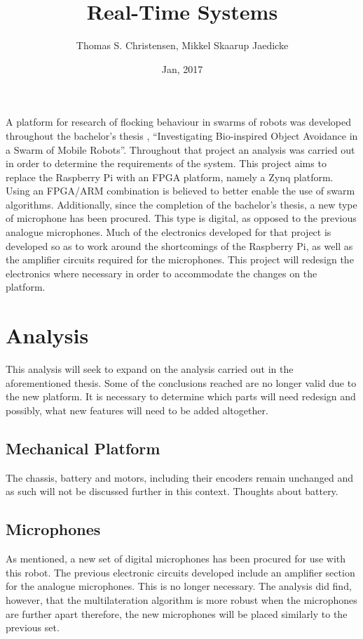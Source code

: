 \documentclass[11pt]{article}
\title{Real-Time Systems}
\author{Thomas S. Christensen, Mikkel Skaarup Jaedicke}
\date{Jan, 2017}
\begin{document}
A platform for research of flocking behaviour in swarms of robots was developed throughout the bachelor's thesis , ``Investigating Bio-inspired Object Avoidance in a Swarm of Mobile Robots''.
Throughout that project an analysis was carried out in order to determine the requirements of the system.
This project aims to replace the Raspberry Pi with an FPGA platform, namely a Zynq platform.
Using an FPGA/ARM combination is believed to better enable the use of swarm algorithms.
Additionally, since the completion of the bachelor's thesis, a new type of microphone has been procured.
This type is digital, as opposed to the previous analogue microphones.
Much of the electronics developed for that project is developed so as to work around the shortcomings of the Raspberry Pi, as well as the amplifier circuits required for the microphones.
This project will redesign the electronics where necessary in order to accommodate the changes on the platform.

\section{Analysis} %
\label{sec:analysis}
This analysis will seek to expand on the analysis carried out in the aforementioned thesis.
Some of the conclusions reached are no longer valid due to the new platform.
It is necessary to determine which parts will need redesign and possibly, what new features will need to be added altogether.

\subsection{Mechanical Platform} %
\label{sub:mechanical_platform}
The chassis, battery and motors, including their encoders remain unchanged and as such will not be discussed further in this context.
Thoughts about battery.

\subsection{Microphones} %
\label{sub:microphones}
As mentioned, a new set of digital microphones has been procured for use with this robot. 
The previous electronic circuits developed include an amplifier section for the analogue microphones.
This is no longer necessary.
The analysis did find, however, that the multilateration algorithm is more robust when the microphones are further apart therefore, the new microphones will be placed similarly to the previous set.
\end{document}
